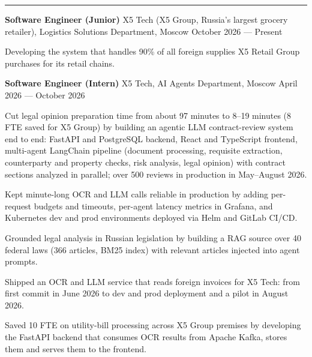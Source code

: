 \documentclass[10pt,a4paper]{article}
\newcommand{\cvsection}[1]{%
  \vspace{5pt}{\large\bfseries #1}\par\vspace{2pt}\hrule\vspace{3pt}}
\newcommand{\cventry}[3]{%
  \textbf{#1} \textbar{} #3 \textbar{} #2\par\vspace{1pt}}
\begin{document}
\cvsection{Work Experience}
\cventry{Software Engineer (Junior)}{October 2026 --- Present}{X5 Tech (X5 Group, Russia's largest grocery retailer), Logistics Solutions Department, Moscow}
\begin{cvitems}
    \item Developing the system that handles 90\% of all foreign supplies X5 Retail Group purchases for its retail chains.
\end{cvitems}
\vspace{2pt}
\cventry{Software Engineer (Intern)}{April 2026 --- October 2026}{X5 Tech, AI Agents Department, Moscow}
\begin{cvitems}
    \item Cut legal opinion preparation time from about 97 minutes to 8--19 minutes (8 FTE saved for X5 Group) by building an agentic LLM contract-review system end to end: FastAPI and PostgreSQL backend, React and TypeScript frontend, multi-agent LangChain pipeline (document processing, requisite extraction, counterparty and property checks, risk analysis, legal opinion) with contract sections analyzed in parallel; over 500 reviews in production in May--August 2026.
    \item Kept minute-long OCR and LLM calls reliable in production by adding per-request budgets and timeouts, per-agent latency metrics in Grafana, and Kubernetes dev and prod environments deployed via Helm and GitLab CI/CD.
    \item Grounded legal analysis in Russian legislation by building a RAG source over 40 federal laws (366 articles, BM25 index) with relevant articles injected into agent prompts.
    \item Shipped an OCR and LLM service that reads foreign invoices for X5 Tech: from first commit in June 2026 to dev and prod deployment and a pilot in August 2026.
    \item Saved 10 FTE on utility-bill processing across X5 Group premises by developing the FastAPI backend that consumes OCR results from Apache Kafka, stores them and serves them to the frontend.
\end{cvitems}
\end{document}
